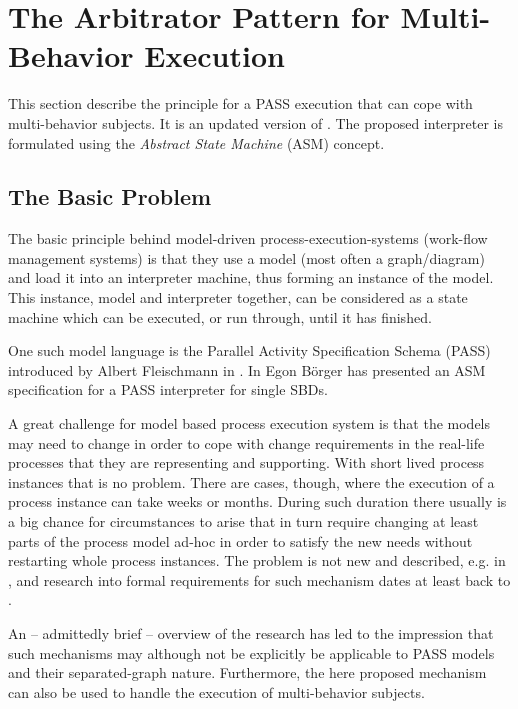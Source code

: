 \newpage
\section{The Arbitrator Pattern for Multi-Behavior Execution}

This section describe the principle for a PASS execution that can cope with multi-behavior subjects. It is an updated version of \cite{elster:arbitrator}. The proposed interpreter is formulated using the \textit{Abstract State Machine} (ASM) concept.

\subsection{The Basic Problem}

The basic principle behind model-driven process-execution-systems (work-flow management systems) is that they use a model (most often a graph/diagram) and load it into an interpreter machine, thus forming an instance of the model. This instance, model and interpreter together, can be considered as a state machine which can be executed, or run through, until it has finished. 

One such model language is the Parallel Activity Specification Schema (PASS) introduced by Albert Fleischmann in \cite{book:Flei94}. In \cite{boerger2011interpreter} Egon Börger has presented an ASM specification for a PASS interpreter for single SBDs. 

A great challenge for model based process execution system is that the models may need to change in order to cope with change requirements in the real-life processes that they are representing and supporting. With short lived process instances that is no problem. There are cases, though, where the execution of a process instance can take weeks or months. During such duration there usually is a big chance for circumstances to arise that in turn require changing at least parts of the process model ad-hoc in order to satisfy the new needs without restarting whole process instances.
The problem is not new and described, e.g. in \cite{dadam:adept}, and research into formal requirements for such mechanism dates at least back to \cite{reichert:adeptflex}. 

An – admittedly brief – overview of the research has led to the impression that such mechanisms may although not be explicitly be applicable to PASS models and their separated-graph nature. Furthermore, the here proposed mechanism can also be used to handle the execution of multi-behavior subjects.

